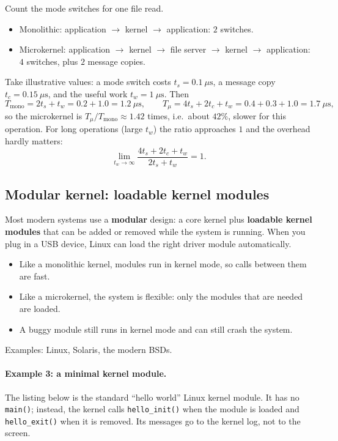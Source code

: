 \documentclass[11pt,a4paper]{article}
\newcommand{\term}[1]{\textbf{\color{mintdeep}#1}}
\newcommand{\cmd}[1]{\texttt{#1}}
\begin{document}
\begin{example}
Count the mode switches for one file read.
\begin{itemize}
  \item Monolithic: application $\to$ kernel $\to$ application: $2$ switches.
  \item Microkernel: application $\to$ kernel $\to$ file server $\to$ kernel $\to$ application: $4$ switches, plus $2$ message copies.
\end{itemize}
Take illustrative values: a mode switch costs $t_{s} = 0.1\ \mu\text{s}$, a message copy $t_{c} = 0.15\ \mu\text{s}$, and the useful work $t_{w} = 1\ \mu\text{s}$. Then
\[
T_{\text{mono}} = 2t_{s} + t_{w} = 0.2 + 1.0 = 1.2\ \mu\text{s},
\qquad
T_{\mu} = 4t_{s} + 2t_{c} + t_{w} = 0.4 + 0.3 + 1.0 = 1.7\ \mu\text{s},
\]
so the microkernel is $T_{\mu}/T_{\text{mono}} \approx 1.42$ times, i.e.\ about $42\%$, slower for this operation. For long operations (large $t_{w}$) the ratio approaches $1$ and the overhead hardly matters:
\[
\lim_{t_{w}\to\infty} \frac{4t_{s} + 2t_{c} + t_{w}}{2t_{s} + t_{w}} = 1 .
\]
\end{example}

\subsection{Modular kernel: loadable kernel modules}

Most modern systems use a \term{modular} design: a core kernel plus \term{loadable kernel modules} that can be added or removed while the system is running. When you plug in a USB device, Linux can load the right driver module automatically.

\begin{itemize}
  \item[\textcolor{mintdeep}{$+$}] Like a monolithic kernel, modules run in kernel mode, so calls between them are fast.
  \item[\textcolor{mintdeep}{$+$}] Like a microkernel, the system is flexible: only the modules that are needed are loaded.
  \item[\textcolor{red!60!black}{$-$}] A buggy module still runs in kernel mode and can still crash the system.
\end{itemize}
Examples: Linux, Solaris, the modern BSDs.

\paragraph{Example 3: a minimal kernel module.} The listing below is the standard ``hello world'' Linux kernel module. It has no \cmd{main()}; instead, the kernel calls \cmd{hello\_init()} when the module is loaded and \cmd{hello\_exit()} when it is removed. Its messages go to the kernel log, not to the screen.
\end{document}

